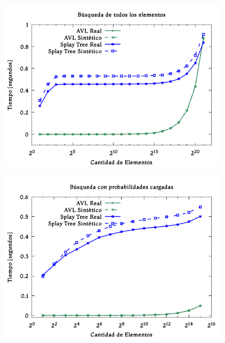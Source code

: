\documentclass[12pt,letterpaper]{report}
\begin{document}
\begin{figure}[H]
\begin{center}
\includegraphics[scale=0.65]{degenerado_busquedanormal.png}
\end{center}
\end{figure}

\begin{figure}[H]
\begin{center}
\includegraphics[scale=0.65]{degenerado_busquedacargada.png}
\end{center}
\end{figure}
\end{document}
